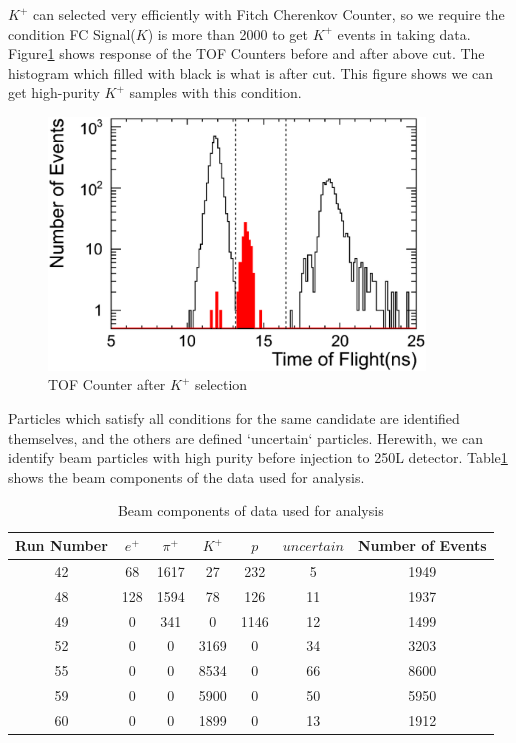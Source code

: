 $K^{+}$ can selected very efficiently with Fitch Cherenkov Counter,
so we require the condition FC Signal($K$) is more than 2000
to get $K^{+}$ events in taking data.
Figure\ref{fig:TOF_cut} shows response of the TOF Counters before and after above cut.
The histogram which filled with black is what is after cut.
This figure shows we can get high-purity $K^{+}$ samples with this condition.

\begin{figure}[htbp]
  \centering
  \includegraphics[width=10cm,clip]{fig/TOF_cut.eps}
  \caption{TOF Counter after $K^{+}$ selection}
  \label{fig:TOF_cut}
\end{figure}

Particles which satisfy all conditions for the same candidate are identified themselves, and the others are defined `uncertain` particles.
Herewith, we can identify beam particles with high purity before injection to 250L detector.
Table\ref{tb:component} shows the beam components of the data used for analysis.\\

\begin{table}
  \centering
  \begin{tabular}[htb]{ccccccc}\hline
    Run Number    & $e^{+}$ & $\pi^{+}$ & $K^{+}$ & $p$   & $uncertain$ & Number of Events \\ \hline
    42            & 68      & 1617      & 27      & 232   & 5           & 1949             \\
    48            & 128     & 1594      & 78      & 126   & 11          & 1937             \\
    49            & 0       & 341       & 0       & 1146  & 12          & 1499             \\
    52            & 0       & 0         & 3169    & 0     & 34          & 3203             \\
    55            & 0       & 0         & 8534    & 0     & 66          & 8600             \\
    59            & 0       & 0         & 5900    & 0     & 50          & 5950             \\
    60            & 0       & 0         & 1899    & 0     & 13          & 1912             \\ \hline
  \end{tabular}
  \label{tb:component}
  \caption{Beam components of data used for analysis}
\end{table}

